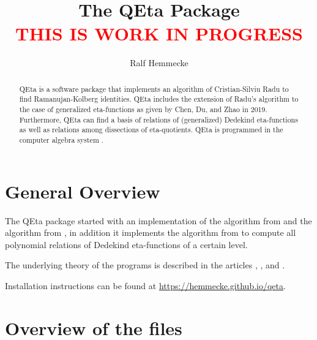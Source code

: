 \documentclass{article}
\begin{document}
\title{The QEta Package\\
\textcolor{red}{THIS IS WORK IN PROGRESS}}
\author{Ralf Hemmecke}
\maketitle
\begin{abstract}
  QEta is a software package that implements an algorithm of
  Cristian-Silviu Radu to find Ramanujan-Kolberg identities. QEta
  includes the extension of Radu's algorithm to the case of
  generalized eta-functions as given by Chen, Du, and Zhao in 2019.
  Furthermore, QEta can find a basis of relations of (generalized)
  Dedekind eta-functions as well as relations among dissections of
  eta-quotients.
  QEta is programmed in the computer algebra system \FriCAS{}.
\end{abstract}

\tableofcontents

\section{General Overview}

The QEta package started with an implementation of the 
algorithm from \cite{Radu_RamanujanKolberg_2015} and the \algoSamba{}
algorithm from \cite{Hemmecke_DancingSambaRamanujan_2018}, in addition
it implements the algorithm from
\cite{HemmeckeRadu_EtaRelations_2019} to compute all polynomial
relations of Dedekind eta-functions of a certain level.

The underlying theory of the programs is described in the articles
\cite{Radu_RamanujanKolberg_2015},
\cite{Hemmecke_DancingSambaRamanujan_2018}, and
\cite{HemmeckeRadu_EtaRelations_2019}.

Installation instructions can be found at
\url{https://hemmecke.github.io/qeta}.

\section{Overview of the files}
\end{document}
